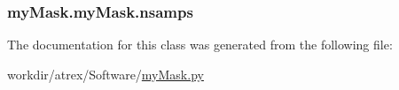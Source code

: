 \hypertarget{classmy_mask_1_1my_mask_aec05f7b9af1f9ba5b283f1034f229cdc}{
\subsubsection[{nsamps}]{\setlength{\rightskip}{0pt plus 5cm}my\-Mask.\-my\-Mask.\-nsamps}}\label{classmy_mask_1_1my_mask_aec05f7b9af1f9ba5b283f1034f229cdc}


The documentation for this class was generated from the following file\-:\begin{DoxyCompactItemize}
\item 
workdir/atrex/\-Software/\hyperlink{my_mask_8py}{my\-Mask.\-py}\end{DoxyCompactItemize}
